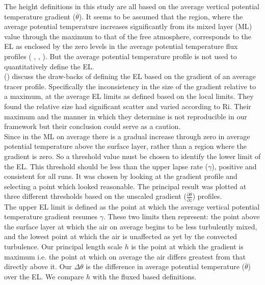 The height definitions in this study are all based on the average vertical potential temperature gradient ($\overline{\theta}$).  It seems to be assumed that the region, where the average potential temperature increases significantly from its mixed layer (\acs{ML}) value through the maximum to that of the free atmosphere, corresponds to the \acs{EL} as enclosed by the zero levels in the average potential temperature flux profiles (\citeauthor{Deardorff79} \cite{Deardorff79}, \citeauthor{FedConzMir04} 
\cite{FedConzMir04}, \citeauthor{GarciaMellado} \cite{GarciaMellado}).  But the average potential temperature profile is not used to quantitatively define the \acs{EL}.\\

\citeauthor{BrooksFowler2} (\cite{BrooksFowler2}) discuss the draw-backs of defining the \acs{EL} based on the 
gradient of an average tracer profile.  Specifically the inconsistency in the size of the gradient
relative to a maximum, at the average \acs{EL} limits as defined based on the local limits. They
found the relative size had significant scatter and varied according to \acs{Ri}. Their maximum and the manner in which they determine is not reproducible in our framework but their conclusion could serve as a caution.\\  

Since in the \acs{ML} on average there is a gradual increase through zero in average potential temperature above the surface layer, rather than a region where the gradient is zero.  So a threshold value must be chosen to identify the lower limit of the \acs{EL}.  This threshold should be less than the upper lapse rate ($\gamma$), positive and consistent for all runs.  It was chosen by looking at the gradient profile and selecting a point which looked reasonable. The principal result was plotted at three different thresholds based on the unscaled gradient ($\frac{\partial \overline{\theta}}{\partial z}$) profiles.\\

The upper \acs{EL} limit is defined as the point at which the average vertical potential temperature gradient resumes $\gamma$.  These two limits then represent: the point above the surface layer at which the air on average begins to be less turbulently mixed, and the lowest point at which the air is unaffected as yet by the convected turbulence.  Our principal length scale $h$ is the point at which the gradient is maximum i.e. the point at which on average the air differs greatest from that directly above it. Our $\Delta \theta$ is the difference in average potential temperature ($\overline{\theta}$) over the \acs{EL}.  We compare $h$ with the fluxed based definitions.
  
